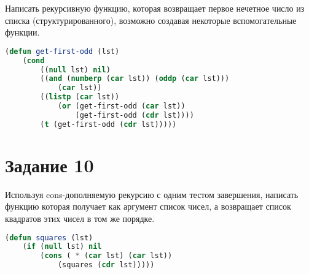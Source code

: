 Написать рекурсивную функцию, которая возвращает первое нечетное число из списка (структурированного), возможно создавая некоторые вспомогательные функции.

\begin{lstlisting}[language=Lisp]
(defun get-first-odd (lst)
	(cond
		((null lst) nil)
		((and (numberp (car lst)) (oddp (car lst)))
			(car lst))
		((listp (car lst))
			(or (get-first-odd (car lst))
				(get-first-odd (cdr lst))))
		(t (get-first-odd (cdr lst)))))
\end{lstlisting}

\section{Задание 10}

Используя cons-дополняемую рекурсию с одним тестом завершения,
написать функцию которая получает как аргумент список чисел, а возвращает список
квадратов этих чисел в том же порядке.

\begin{lstlisting}[language=Lisp]
(defun squares (lst)
	(if (null lst) nil
		(cons ( * (car lst) (car lst))
			(squares (cdr lst)))))
\end{lstlisting}
